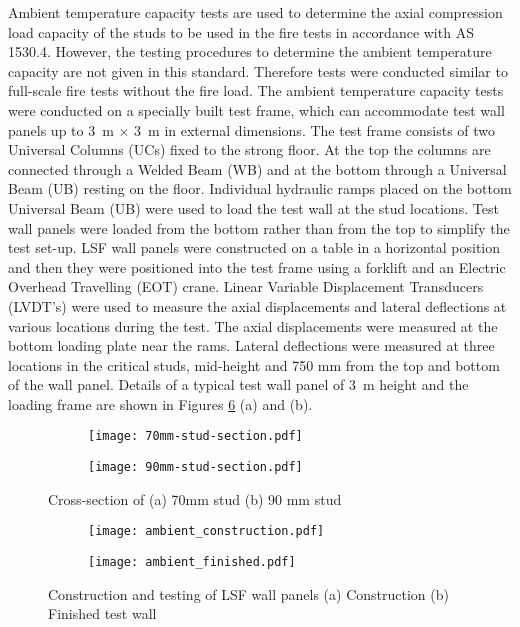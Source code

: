 Ambient temperature capacity tests are used to determine the axial compression load capacity of the studs to be used in the fire tests in accordance with AS 1530.4. However, the testing procedures to determine the ambient temperature capacity are not given in this standard. Therefore tests were conducted similar to full-scale fire tests without the fire load. The ambient temperature capacity tests were conducted on a specially built test frame, which can accommodate test wall panels up to 3~m $\times$ 3~m in external dimensions. The test frame consists of two Universal Columns (UCs) fixed to the strong floor. At the top the columns are connected through a Welded Beam (WB) and at the bottom through a Universal Beam (UB) resting on the floor. Individual hydraulic ramps placed on the bottom Universal Beam (UB) were used to load the test wall at the stud locations. Test wall panels were loaded from the bottom rather than from the top to simplify the test set-up. LSF wall panels were constructed on a table in a horizontal position and then they were positioned into the test frame using a forklift and an Electric Overhead Travelling (EOT) crane. Linear Variable Displacement Transducers (LVDT's) were used to measure the axial displacements and lateral deflections at various locations during the test. The axial displacements were measured at the bottom loading plate near the rams. Lateral deflections were measured at three locations in the critical studs, mid-height and 750 mm from the top and bottom of the wall panel. Details of a typical test wall panel of 3~m height and the loading frame are shown in Figures \ref{fig:typical-ambient} (a) and (b).
\begin{figure}
	\centering
	\begin{subfigure}[b]{0.2\textwidth}
		\centering
		\texttt{[image: 70mm-stud-section.pdf]}
		\caption{}
		\label{subfig:70mm-section}
	\end{subfigure}
	\begin{subfigure}[b]{0.2\textwidth}
		\centering
		\texttt{[image: 90mm-stud-section.pdf]}
		\caption{}
		\label{subfig:90mm-section}
	\end{subfigure}
	   \caption{Cross-section of (a) 70mm stud (b) 90 mm stud}
	   \label{fig:stud-cross-section}
\end{figure}
\begin{figure}
	\centering
	\begin{subfigure}[b]{0.75\textwidth}
		\centering
		\texttt{[image: ambient\_construction.pdf]}
		\caption{}
		\label{subfig:ambient_construction}
	\end{subfigure}
	\begin{subfigure}[b]{0.75\textwidth}
		\centering
		\texttt{[image: ambient\_finished.pdf]}
		\caption{}
		\label{subfig:ambient_finished}
	\end{subfigure}
	   \caption{Construction and testing of LSF wall panels (a) Construction (b) Finished test wall}
	   \label{fig:typical-ambient}
\end{figure}
